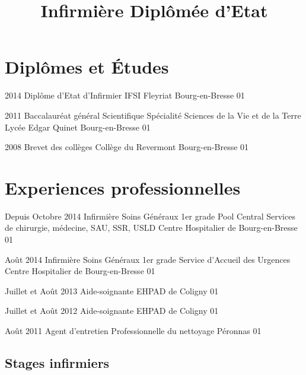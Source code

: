 \documentclass[10pt,a4paper]{moderncv}
\title{Infirmière Diplômée d'Etat}
\begin{document}
\maketitle
\pagestyle{empty}


\section{Diplômes et Études}

\cventry
	{2014}
	{Diplôme d'Etat d'Infirmier}
	{IFSI Fleyriat}
	{Bourg-en-Bresse}
	{01}
	{}

\cventry
	{2011}
	{Baccalauréat général Scientifique}
	{Spécialité Sciences de la Vie et de la Terre}
	{Lycée Edgar Quinet}
	{Bourg-en-Bresse}
	{01}

\cventry
	{2008}
	{Brevet des collèges}
	{Collège du Revermont}
	{Bourg-en-Bresse}
	{01}
	{}


\section{Experiences professionnelles}


\cventry
	{Depuis Octobre 2014}
	{Infirmière Soins Généraux 1er grade}
	{Pool Central}
	{Services de chirurgie, médecine, SAU, SSR, USLD}
	{Centre Hospitalier de Bourg-en-Bresse}
	{01}

\cventry
	{Août 2014}
	{Infirmière Soins Généraux 1er grade}
	{Service d'Accueil des Urgences}
	{Centre Hospitalier de Bourg-en-Bresse}
	{01}
	{}


\cventry
	{Juillet et Août 2013}
	{Aide-soignante}
	{EHPAD de Coligny}
	{01}
	{}
	{}

\cventry
    {Juillet et Août 2012}
	{Aide-soignante}
	{EHPAD de Coligny}
	{01}
	{}
	{}

\cventry
	{Août 2011}
	{Agent d'entretien}
	{Professionnelle du nettoyage}
	{Péronnas}
	{01}
	{}

\subsection{Stages infirmiers}
\end{document}
